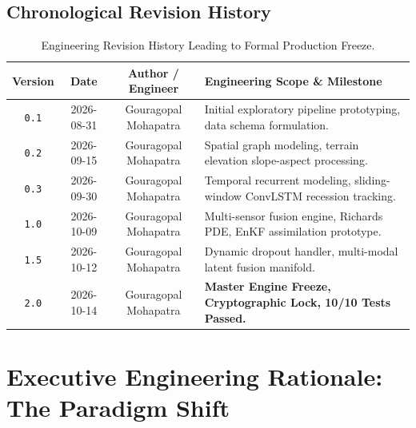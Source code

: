 \documentclass[11pt,a4paper]{article}
\theoremstyle{definition}
\theoremstyle{remark}
\begin{document}
\subsection{Chronological Revision History}
\begin{table}[h!]
\centering
\small
\begin{tabular}{cccl}
\toprule
\textbf{Version} & \textbf{Date} & \textbf{Author / Engineer} & \textbf{Engineering Scope \& Milestone} \\
\midrule
\texttt{0.1} & 2026-08-31 & Gouragopal Mohapatra & Initial exploratory pipeline prototyping, data schema formulation. \\
\texttt{0.2} & 2026-09-15 & Gouragopal Mohapatra & Spatial graph modeling, terrain elevation slope-aspect processing. \\
\texttt{0.3} & 2026-09-30 & Gouragopal Mohapatra & Temporal recurrent modeling, sliding-window ConvLSTM recession tracking. \\
\texttt{1.0} & 2026-10-09 & Gouragopal Mohapatra & Multi-sensor fusion engine, Richards PDE, EnKF assimilation prototype. \\
\texttt{1.5} & 2026-10-12 & Gouragopal Mohapatra & Dynamic dropout handler, multi-modal latent fusion manifold. \\
\texttt{2.0} & 2026-10-14 & Gouragopal Mohapatra & \textbf{Master Engine Freeze, Cryptographic Lock, 10/10 Tests Passed.} \\
\bottomrule
\end{tabular}
\caption{Engineering Revision History Leading to Formal Production Freeze.}
\label{tab:revision_history}
\end{table}

\section{Executive Engineering Rationale: The Paradigm Shift}
\end{document}
